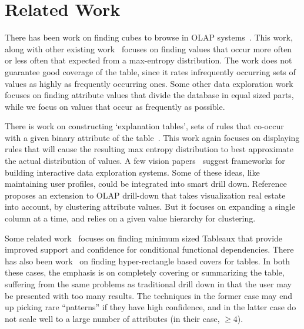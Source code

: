 \documentclass[10pt,journal,compsoc]{IEEEtran}
\newcounter{prob}
\begin{document}
\section{Related Work}\label{sec:related}

There has been work on finding cubes to browse in OLAP systems~\cite{Sarawagi:2001:UMA:767141.767148, Sarawagi00user-adaptiveexploration, Sarawagi98discovery-drivenexploration}. This work, along with other existing work~\cite{Mampaey:2011:TMI:2020408.2020499} focuses on finding values that occur more often or less often that expected from a max-entropy distribution. The work does not guarantee good coverage of the table, since it rates infrequently occurring sets of values as highly as frequently occurring ones. Some other data exploration work~\cite{sellam:meet} focuses on finding attribute values that divide the database in equal sized parts, while we focus on values that occur as frequently as possible. 

There is work on constructing `explanation tables', sets of rules that co-occur with a given binary attribute of the table~\cite{DBLP:journals/pvldb/GebalyAGKS14}. This work again focuses on displaying rules that will cause the resulting max entropy distribution to best approximate the actual distribution of values. A few vision papers~\cite{data-deluge, cetintemel2013query} suggest frameworks for building interactive data exploration systems. Some of these ideas, like maintaining user profiles, could be integrated into smart drill down. Reference~\cite{DBLP:conf/edbt/CandanCQS09} proposes an extension to OLAP drill-down that takes visualization real estate into account, by clustering attribute values. But it focuses on expanding a single column at a time, and relies on a given value hierarchy for clustering.

Some related work~\cite{DBLP:journals/debu/GolabKS11, Golab:2008:GNT:1453856.1453900} focuses on finding minimum sized Tableaux that provide improved support and confidence for conditional functional dependencies. There has also been work~\cite{Bu:2005:MSH:1083592.1083644, Lakshmanan:2002:GMA:1287369.1287435, DBLP:conf:kdd:XiangJFD08, Geerts04tilingdatabases} on finding hyper-rectangle based covers for tables. In both these cases, the emphasis is on completely covering or 
summarizing the table, suffering from the same problems as traditional drill down in that the user may be presented with
too many results. The techniques in the former case may end up picking rare ``patterns'' if they have high confidence, and in the latter case do not scale well to a large number of attributes (in their case, $\geq 4$). 
\end{document}
